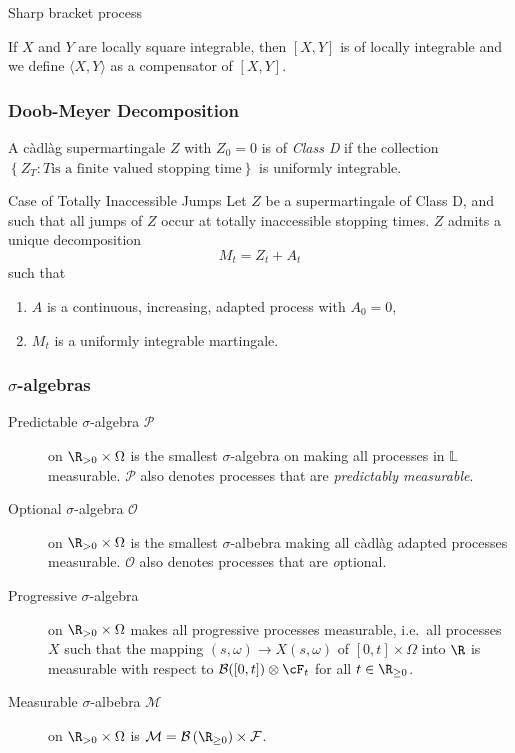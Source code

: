 \begin{frame}
    {Sharp bracket process}
    
    If $X$ and $Y$ are locally square integrable, then $\left[ X,Y \right]$ is
    of locally integrable and we define $\langle X,Y \rangle$ as a compensator
    of $\left[ X,Y \right]$.
\end{frame}






\begin{frame}
    \frametitle{Doob-Meyer Decomposition}

    A c\`adl\`ag supermartingale $Z$ with $Z_0=0$ is of
    \emph{Class D} if the collection $\left\{ Z_T : T \textrm{is a finite valued stopping time} \right\}$ 
    is uniformly integrable. 

    \begin{block}{Case of Totally Inaccessible Jumps}
        Let $Z$ be a supermartingale of Class D, and such that all jumps of $Z$
        occur at totally inaccessible stopping times. $Z$ admits a unique decomposition
        \begin{equation}
            M_t=Z_t + A_t
        \end{equation}
        such that 
        \begin{enumerate}
            \item $A$ is a continuous, increasing, adapted process with $A_0=0$,
            \item $M_t$ is a uniformly integrable martingale.
        \end{enumerate}
    \end{block}


\end{frame}


\begin{frame}
    \frametitle{$\sigma$-algebras}
        
    \begin{description}
        \item[Predictable $\sigma$-algebra $\mathcal P$] on $\R_{>0} \times \Omega$ is the 
            smallest $\sigma$-algebra on making all processes in $\mathbb L$ measurable. 
            $\mathcal P$ also denotes processes that are \emph{predictably measurable}. 
        \item[Optional $\sigma$-algebra $\mathcal O$] on $\R_{>0} \times \Omega$ is the smallest
            $\sigma$-albebra making all c\`adl\`ag adapted processes measurable. 
            $\mathcal O$ also denotes processes that are \emph optional.
        \item[Progressive $\sigma$-algebra] on $\R_{>0} \times \Omega$ makes all progressive
        processes measurable, i.e.\ all processes $X$ such that the mapping 
        $(s, \omega)\to X(s,\omega)$ of $[0,t]\times \Omega$ into $\R$ is measurable
        with respect to $\mathcal B([0,t]) \otimes \cF_t$ for all $t\in\R_{\geq 0}$.
        \item[Measurable $\sigma$-albebra $\mathcal M$] on $\R_{>0} \times \Omega$ is 
            $\mathcal M = \mathcal B\left( \R_{\geq 0} \right) \times \mathcal F$.
    \end{description}
\end{frame}


